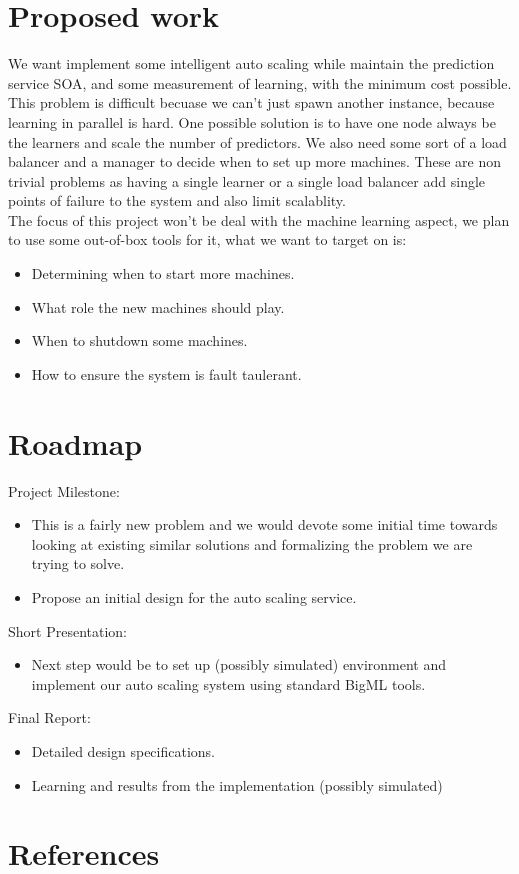 \documentclass[letterpaper]{article}
\begin{document}
\section{Proposed work}
We want implement some intelligent auto scaling while maintain the prediction service SOA, and some measurement of learning, with the minimum cost possible. This problem is difficult becuase we can't just spawn another instance, because learning in parallel is hard. One possible solution is to have one node always be the learners and scale the number of predictors. We also need some sort of a load balancer and a manager to decide when to set up more machines. These are non trivial problems as having a single learner or a single load balancer add single points of failure to the system and also limit scalablity. \\
The focus of this project won't be deal with the machine learning aspect, we plan to use some out-of-box tools for it, what we want to target on is:
\begin{itemize}
\item Determining when to start more machines.
\item What role the new machines should play.
\item When to shutdown some machines.
\item How to ensure the system is fault taulerant.
\end{itemize}
\section{Roadmap}
Project Milestone: 
\begin{itemize} 
\item This is a fairly new problem and we would devote some initial time towards looking at existing similar solutions and formalizing the problem we are trying to solve.
\item Propose an initial design for the auto scaling service.
\end{itemize}
Short Presentation:
\begin{itemize} 
\item Next step would be to set up (possibly simulated) environment and implement our auto scaling system using standard BigML tools. 
\end{itemize}
Final Report:
\begin{itemize}
\item Detailed design specifications. 
\item Learning and results from the implementation (possibly simulated)
\end{itemize}

\section{References}
\end{document}
